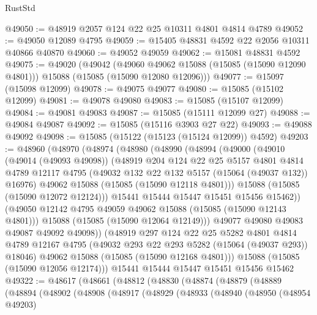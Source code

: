 \begin{lexlean}{RustStd}
\begin{coremodule}
@49050 := @48919 @2057 @124 @22 @25 @10311 @4801 @4814 @4789
@49052 := @49050 @12089 @4795
@49059 := @15405 @48831 @4592 @22 @2056 @10311 @40866 @40870
@49060 := @49052 @49059
@49062 := @15081 @48831 @4592
@49075 := @49020
    (@49042
      (@49060 @49062 @15088 (@15085 (@15090 @12090 @4801)))
      @15088
      (@15085 (@15090 @12080 @12096)))
@49077 := @15097 (@15098 @12099)
@49078 := @49075 @49077
@49080 := @15085 (@15102 @12099)
@49081 := @49078 @49080
@49083 := @15085 (@15107 @12099)
@49084 := @49081 @49083
@49087 := @15085 (@15111 @12099 @27)
@49088 := @49084 @49087
@49092 := @15085 (@15116 @3903 @27 @22)
@49093 := @49088 @49092
@49098 := @15085 (@15122 (@15123 (@15124 @12099)) @4592)
@49203 := @48960
    (@48970
      (@48974
        (@48980
          (@48990
            (@48994
              (@49000
                (@49010
                  (@49014 (@49093 @49098))
                  (@48919
                    @204
                    @124
                    @22
                    @25
                    @5157
                    @4801
                    @4814
                    @4789
                    @12117
                    @4795
                    (@49032 @132 @22 @132 @5157 (@15064 (@49037 @132)) @16976)
                    @49062
                    @15088
                    (@15085 (@15090 @12118 @4801)))
                  @15088
                  (@15085 (@15090 @12072 @12124)))
                @15441
                @15444
                @15447
                @15451
                @15456
                @15462))
            (@49050 @12142 @4795 @49059 @49062 @15088 (@15085 (@15090 @12143 @4801)))
            @15088
            (@15085 (@15090 @12064 @12149)))
          @49077
          @49080
          @49083
          @49087
          @49092
          @49098))
      (@48919
        @297
        @124
        @22
        @25
        @5282
        @4801
        @4814
        @4789
        @12167
        @4795
        (@49032 @293 @22 @293 @5282 (@15064 (@49037 @293)) @18046)
        @49062
        @15088
        (@15085 (@15090 @12168 @4801)))
      @15088
      (@15085 (@15090 @12056 @12174)))
    @15441
    @15444
    @15447
    @15451
    @15456
    @15462
@49322 := @48617
    (@48661
      (@48812
        (@48830
          (@48874
            (@48879
              (@48889
                (@48894
                  (@48902
                    (@48908
                      (@48917
                        (@48929
                          (@48933
                            (@48940
                              (@48950
                                (@48954 @49203)

\end{coremodule}
\end{lexlean}
